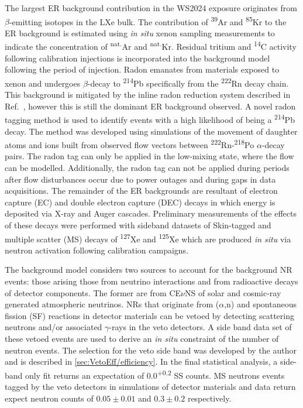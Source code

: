 The largest ER background contribution in the WS2024 exposure originates from $\beta$-emitting isotopes in the LXe bulk. The contribution of \textsuperscript{39}Ar and \textsuperscript{85}Kr to the ER background is estimated using \textit{in situ} xenon sampling measurements to indicate the concentration of \textsuperscript{nat.}Ar and \textsuperscript{nat.}Kr. Residual tritium and \textsuperscript{14}C activity following calibration injections is incorporated into the background model following the period of injection. Radon emanates from materials exposed to xenon and undergoes $\beta$-decay to \textsuperscript{214}Pb specifically from the \textsuperscript{222}Rn decay chain. This background is mitigated by the inline radon reduction system described in Ref.~\cite{marthurs:thesis}, however this is still the dominant ER background observed. A novel radon tagging method is used to identify events with a high likelihood of being a \textsuperscript{214}Pb decay. The method was developed using simulations of the movement of daughter atoms and ions built from observed flow vectors between \textsuperscript{222}Rn-\textsuperscript{218}Po $\alpha$-decay pairs. The radon tag can only be applied in the low-mixing state, where the flow can be modelled. Additionally, the radon tag can not be applied during periods after flow disturbances occur due to power outages and during gaps in data acquisitions. The remainder of the ER backgrounds are resultant of electron capture (EC) and double electron capture (DEC) decays in which energy is deposited via X-ray and Auger cascades. Preliminary measurements of the effects of these decays were performed with sideband datasets of Skin-tagged and multiple scatter (MS) decays of \textsuperscript{127}Xe and \textsuperscript{125}Xe which are produced \textit{in situ} via neutron activation following calibration campaigns.

The background model considers two sources to account for the background NR events: those arising those from neutrino interactions and from radioactive decays of detector components. The former are from CE$\nu$NS of solar and cosmic-ray generated atmospheric neutrinos. NRs that originate from ($\alpha$,n) and spontaneous fission (SF) reactions in detector materials can be vetoed by detecting scattering neutrons and/or associated $\gamma$-rays in the veto detectors. A side band data set of these vetoed events are used to derive an \textit{in situ} constraint of the number of neutron events. The selection for the veto side band was developed by the author and is described in \autoref{sec:VetoEff/efficiency}.
In the final statistical analysis, a side-band only fit returns an expectation of 0.0\textsuperscript{+0.2} SS counts. MS neutrons events tagged by the veto detectors in simulations of detector materials and data return expect neutron counts of $0.05\pm0.01$ and $0.3\pm0.2$ respectively.


